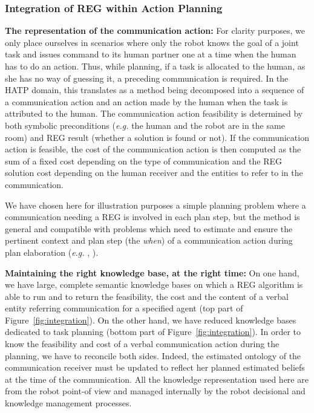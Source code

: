 \documentclass[a4paper,11pt,twoside]{StyleThese}
\begin{document}
\subsubsection{Integration of REG within Action Planning}
\textbf{The representation of the communication action:}
For clarity purposes, we only place ourselves in scenarios where only the robot knows the goal of a joint task and issues command to its human partner one at a time when the human has to do an action. Thus, while planning, if a task is allocated to the human, as she has no way of guessing it, a preceding communication is required. In the HATP domain, this translates as a method being decomposed into a sequence of a communication action and an action made by the human when the task is attributed to the human. The communication action feasibility is determined by both symbolic preconditions (\textit{e.g.} the human and the robot are in the same room) and REG result (whether a solution is found or not). If the communication action is feasible, the cost of the communication action is then computed as the sum of a fixed cost depending on the type of communication and the REG solution cost depending on the human receiver and the entities to refer to in the communication.

We have chosen here for illustration purposes a simple planning problem where a communication needing a REG is involved in each plan step, but the method is general and compatible with problems which need to  estimate and ensure the pertinent context and plan step (the \textit{when}) of a communication action during plan elaboration (\textit{e.g.} \cite{devin2016implemented}, \cite{unhelkar2020decision}).

\textbf{Maintaining the right knowledge base, at the right time:}
On one hand, we have large, complete semantic knowledge bases on which a REG algorithm is able to run and to return the feasibility, the cost and the content of a verbal entity referring communication for a specified agent (top part of Figure~\ref{fig:integration}). On the other hand, we have reduced knowledge bases dedicated to task planning (bottom part of Figure~\ref{fig:integration}). In order to know the feasibility and cost of a verbal communication action during the planning, we have to reconcile both sides. Indeed, the estimated ontology of the communication receiver must be updated to reflect her planned estimated beliefs at the time of the communication. All the knowledge representation used here are from the robot point-of view and managed internally by the robot decisional and knowledge management processes.
\end{document}
